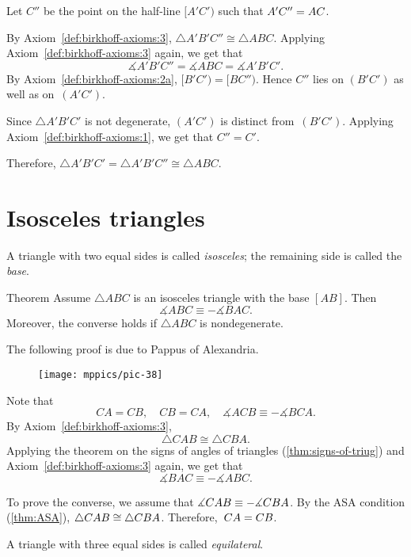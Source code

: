 Let $C''$ be the point on the half-line $[A' C')$ such that $A' C''=A C$. 

By Axiom~\ref{def:birkhoff-axioms:3}, 
$\triangle A' B' C''\cong \triangle A B C$. 
Applying Axiom~\ref{def:birkhoff-axioms:3} again,
we get that
$$\measuredangle A' B' C'' = \measuredangle A B C=\measuredangle A' B' C'.$$
By Axiom~\ref{def:birkhoff-axioms:2a}, $[B'C')=[B C'')$. 
Hence
$C''$ lies on $(B' C')$ as well as on~$(A' C')$.

Since $\triangle A' B' C'$ is not degenerate, $(A' C')$ is distinct from~$(B' C')$.
Applying Axiom~\ref{def:birkhoff-axioms:1}, we get that $C''=C'$. 

Therefore, 
$\triangle A' B' C'=\triangle A' B' C''\cong\triangle A B C$.
\qeds

\section{Isosceles triangles}

A triangle with two equal sides is called \emph{isosceles};
the remaining side is called the \emph{base}.


\begin{thm}[\abs]{Theorem}\label{thm:isos}
Assume $\triangle A B C$ is an isosceles triangle with the base $[A B]$. 
Then 
$$\measuredangle A B C\equiv -\measuredangle B A C.$$
Moreover, the converse holds if $\triangle A B C$ is nondegenerate.
\end{thm}

The following proof is due to Pappus of Alexandria.

\begin{wrapfigure}[10]{o}{25mm}
\vskip-4mm
\centering
\texttt{[image: mppics/pic-38]}
\end{wrapfigure}

Note that
$$C A = C B,
\quad 
C B=C A,
\quad
\measuredangle A C B \equiv -\measuredangle B C A.$$
By Axiom~\ref{def:birkhoff-axioms:3},
$$\triangle C A B\cong\triangle C B A.$$
Applying the theorem on the signs of angles of triangles (\ref{thm:signs-of-triug}) and Axiom~\ref{def:birkhoff-axioms:3} again,
we get that 
$$\measuredangle B A C
\equiv -\measuredangle A B C.$$

To prove the converse, we assume that
$\measuredangle C A B \equiv - \measuredangle C B A$.
By the ASA condition (\ref{thm:ASA}), $\triangle C A B\cong\triangle CBA$.
Therefore,~$C A=C B$.
\qeds

A triangle with three equal sides is called \emph{equilateral}. 

